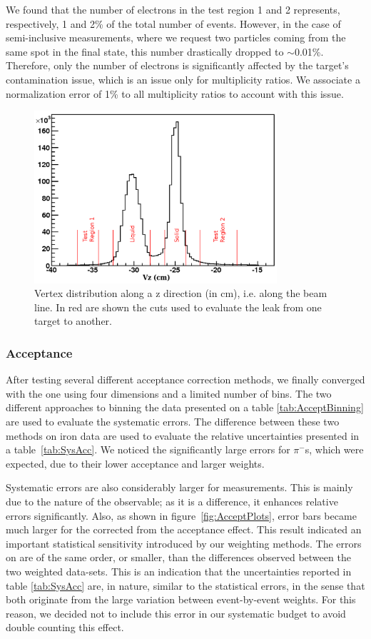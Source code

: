 We found that the number of electrons in the test region 1 and 2 represents, 
respectively, 1 and 2\% of the total number of events. However, in the case 
of semi-inclusive measurements, where we request two particles coming from the
same spot in the final state, this number drastically dropped to $\sim$0.01\%. 
Therefore, only the number of electrons is significantly affected by the 
target's contamination issue, which is an issue only for multiplicity ratios.
We associate a normalization error of 1\% to all multiplicity ratios to account
with this issue.

\begin{figure}[tbp]
\centering
\includegraphics[width=9cm] {chap5-fig/Vertex.png}
\caption {Vertex distribution along a z direction (in cm), i.e. along the 
beam line. In red are shown the cuts used to evaluate the leak from one target to 
another.}
\label{fig:targetleak}
\end{figure}

\subsubsection{Acceptance}

After testing several different acceptance correction methods, we finally 
converged with the one using four dimensions and a limited number of bins.
The two different approaches to binning the data presented on a table 
\ref{tab:AcceptBinning} are used to evaluate the systematic errors. The 
difference between these two methods on iron data are used to evaluate 
the relative uncertainties presented in a table~\ref{tab:SysAcc}. We noticed 
the significantly large errors for $\pi^-$s, which were expected, due to their 
lower acceptance and larger weights. 

Systematic errors are also
considerably larger for \dpt measurements. This is mainly due to the nature of 
the \dpt observable; as it is a difference, it enhances relative errors 
significantly. Also, as shown in figure~\ref{fig:AcceptPlots}, error bars 
became much larger for the corrected \dpt from the acceptance effect. This 
result indicated an important statistical sensitivity introduced by our 
weighting methods. The errors on \dpt are of the same order, or smaller, than 
the differences observed between the two weighted data-sets. This is an 
indication that the uncertainties reported in table \ref{tab:SysAcc} are, in 
nature, similar to the statistical errors, in the sense that both originate 
from the large variation between event-by-event weights. For this reason, we 
decided not to include this error in our systematic budget to avoid double 
counting this effect.

